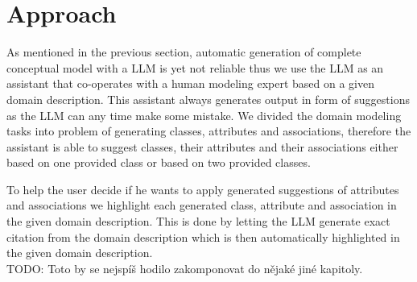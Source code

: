 \chapter{Approach}

As mentioned in the previous section, automatic generation of complete conceptual model with a LLM is yet not reliable thus we use the LLM as an assistant that co-operates with a human modeling expert based on a given domain description. This assistant always generates output in form of suggestions as the LLM can any time make some mistake. We divided the domain modeling tasks into problem of generating classes, attributes and associations, therefore the assistant is able to suggest classes, their attributes and their associations either based on one provided class or based on two provided classes.

To help the user decide if he wants to apply generated suggestions of attributes and associations we highlight each generated class, attribute and association in the given domain description. This is done by letting the LLM generate exact citation from the domain description which is then automatically highlighted in the given domain description. \\

TODO: Toto by se nejspíš hodilo zakomponovat do nějaké jiné kapitoly.